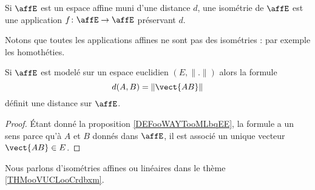 \begin{definition}       \label{DEFooZGKBooGgjkgs}
	Si \( \affE\) est un espace affine muni d'une distance \( d\), une isométrie de \( \affE\) est une application \( f\colon \affE\to \affE\) préservant \( d\).
\end{definition}
Notons que toutes les applications affines ne sont pas des isométries : par exemple les homothéties.

\begin{proposition}     \label{PROPooHSOGooBbFTYt}
	Si \( \affE\) est modelé sur un espace euclidien \( (E,\| . \|)\) alors la formule
	\begin{equation}
		d(A,B)=\| \vect{ AB } \|
	\end{equation}
	définit une distance sur \( \affE\).
\end{proposition}

\begin{proof}
	Étant donné la proposition \ref{DEFooWAYTooMLbqEE}, la formule a un sens parce qu'à \( A\) et \( B\) donnés dans \( \affE\), il est associé un unique vecteur \( \vect{ AB }\in E\).
\end{proof}

Nous parlons d'isométries affines ou linéaires dans le thème \ref{THMooVUCLooCrdbxm}.
